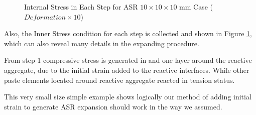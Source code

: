 \begin{figure}[ht!]
      

  \caption{Internal Stress in Each Step for ASR $10 \times 10 \times 10$ mm Case ($Deformation \times 10$)}
  \label{fig:ASR_Small_ASR_IS}
  \end{figure}


Also, the Inner Stress condition for each step is collected and shown in Figure \ref{fig:ASR_Small_ASR_IS}, which can also reveal many details in the expanding procedure.

From step 1 compressive stress is generated in and one layer around the reactive aggregate, due to the initial strain added to the reactive interfaces. While other paste elements located around reactive aggregate reacted in tension status.

This very small size simple example shows logically our method of adding initial strain to generate ASR expansion should work in the way we assumed.
